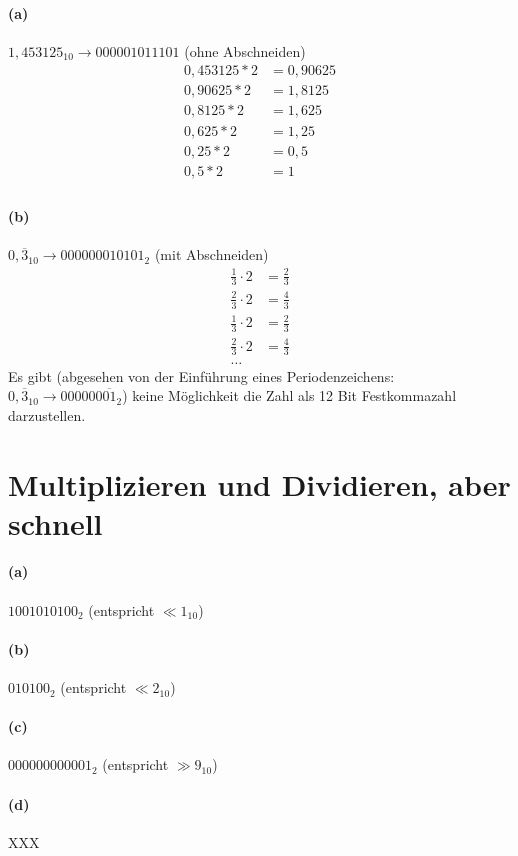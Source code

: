 \documentclass[a4paper]{article}
\begin{document}
\paragraph{(a)}
$1,453125_{10}\rightarrow 000001011101$ (ohne Abschneiden)
\begin{align*}
	0,453125 * 2 &= 0,90625 \\
	0,90625 * 2 &= 1,8125 \\
	0,8125 * 2 &= 1,625 \\
	0,625 * 2 &= 1,25 \\
	0,25 * 2 &= 0,5 \\
	0,5 * 2 &= 1 \\
\end{align*}
\paragraph{(b)}
$0,\overline{3}_{10}\rightarrow 000000010101_{2}$ (mit Abschneiden)
\begin{align*}
	\frac{1}{3}\cdot 2 &= \frac{2}{3} \\
	\frac{2}{3}\cdot 2 &= \frac{4}{3} \\
	\frac{1}{3}\cdot 2 &= \frac{2}{3} \\
	\frac{2}{3}\cdot 2 &= \frac{4}{3} \\
	\text{\ldots}
\end{align*}
Es gibt (abgesehen von der Einführung eines Periodenzeichens: $0,\overline{3}_{10}\rightarrow 000000\overline{01}_{2}$) keine Möglichkeit die Zahl als 12 Bit Festkommazahl darzustellen.



\section{Multiplizieren und Dividieren, aber schnell}
\paragraph{(a)}
$1001010100_{2}$ (entspricht $\ll 1_{10}$)
\paragraph{(b)}
$010100_{2}$ (entspricht $\ll 2_{10}$)
\paragraph{(c)}
$000000000001_{2}$ (entspricht $\gg 9_{10}$)
\paragraph{(d)}
XXX
\end{document}

